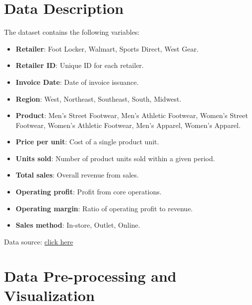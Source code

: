 \documentclass{article}\usepackage[]{graphicx}\usepackage[]{xcolor}
\begin{document}
\section{Data Description}

The dataset contains the following variables:
\begin{itemize}
    \item \textbf{Retailer}: Foot Locker, Walmart, Sports Direct, West Gear.
    \item \textbf{Retailer ID}: Unique ID for each retailer.
    \item \textbf{Invoice Date}: Date of invoice issuance.
    \item \textbf{Region}: West, Northeast, Southeast, South, Midwest.
    \item \textbf{Product}: Men's Street Footwear, Men's Athletic Footwear, Women's Street Footwear, Women's Athletic Footwear, Men's Apparel, Women's Apparel.
    \item \textbf{Price per unit}: Cost of a single product unit.
    \item \textbf{Units sold}: Number of product units sold within a given period.
    \item \textbf{Total sales}: Overall revenue from sales.
    \item \textbf{Operating profit}: Profit from core operations.
    \item \textbf{Operating margin}: Ratio of operating profit to revenue.
    \item \textbf{Sales method}: In-store, Outlet, Online.
\end{itemize}
Data source: \href{https://www.kaggle.com/datasets/heemalichaudhari/adidas-sales-dataset/download?datasetVersionNumber=1}{click here}
\newpage

\section{Data Pre-processing and Visualization}
\end{document}
